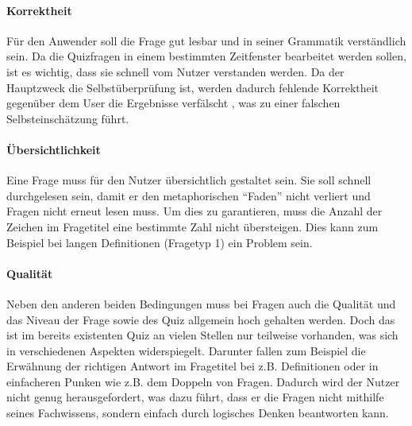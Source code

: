 \documentclass[headsepline,titlepage,ngerman,twoside,12pt]{report}
\begin{document}
\paragraph{Korrektheit}
\label{para:Korrektheit}
Für den Anwender soll die Frage gut lesbar und in seiner Grammatik verständlich sein.
Da die Quizfragen in einem bestimmten Zeitfenster bearbeitet werden sollen, ist es wichtig, dass sie schnell vom Nutzer verstanden werden.
Da der Hauptzweck die Selbstüberprüfung ist, werden dadurch fehlende Korrektheit gegenüber dem User die Ergebnisse verfälscht , was zu einer falschen Selbsteinschätzung führt.
\paragraph{Übersichtlichkeit}
Eine Frage muss für den Nutzer übersichtlich gestaltet sein.
Sie soll schnell durchgelesen sein, damit er den metaphorischen \enquote{Faden} nicht verliert und Fragen nicht erneut lesen muss.
Um dies zu garantieren, muss die Anzahl der Zeichen im Fragetitel eine bestimmte Zahl nicht übersteigen.
Dies kann zum Beispiel bei langen Definitionen (Fragetyp 1) ein Problem sein.
\paragraph{Qualität}
Neben den anderen beiden Bedingungen muss bei Fragen auch die Qualität und das Niveau der Frage sowie des Quiz allgemein hoch gehalten werden.
Doch das ist im bereits existenten Quiz an vielen Stellen nur teilweise vorhanden, was sich in verschiedenen Aspekten widerspiegelt.
Darunter fallen zum Beispiel die Erwähnung der richtigen Antwort im Fragetitel bei z.B. Definitionen oder in einfacheren Punken wie z.B. dem Doppeln von Fragen.
Dadurch wird der Nutzer nicht genug herausgefordert, was dazu führt, dass er die Fragen nicht mithilfe seines Fachwissens, sondern einfach durch logisches Denken beantworten kann. 
\end{document}
